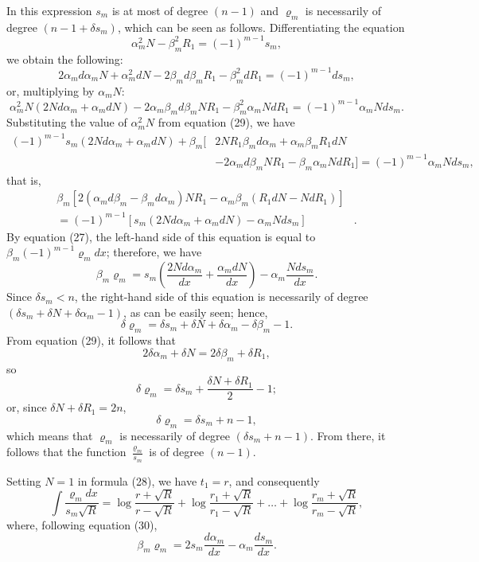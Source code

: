 \documentclass[oneside, 12 pt, leqno]{memoir}
\begin{document}
In this expression \(s_m\) is at most of degree \((n-1)\) and \(\varrho_m\) is necessarily of degree \((n-1+\delta s_m)\), which can be seen as follows. 
Differentiating the equation 
\[\tag{29}\alpha_m^2 N-\beta_m^2 R_1=(-1)^{m-1} s_m,\]
we obtain the following:
\[2 \alpha_m d \alpha_m N+\alpha_m^2 d N-2 \beta_m d \beta_m R_1-\beta_m^2 d R_1=(-1)^{m-1} d s_m,\]
or, multiplying by \(\alpha_m N\):
\[\alpha_m^2 N\left(2 N d \alpha_m+\alpha_m d N\right)-2 \alpha_m \beta_m d \beta_m N R_1-\beta_m^2 \alpha_m N d R_1=(-1)^{m-1} \alpha_m N d s_m.\]
Substituting the value of \(\alpha_m^2 N\) from equation (29), we have
\[\begin{aligned}
(-1)^{m-1} s_m\left(2 N d \alpha_m+\alpha_m d N\right) +\beta_m [&2 N R_1 \beta_m d \alpha_m+\alpha_m \beta_m R_1 d N \\
&-2 \alpha_m d \beta_m N R_1 -\beta_m \alpha_m N d R_1]
=(-1)^{m-1} \alpha_m N d s_m,
\end{aligned}\]
that is,
\[\begin{aligned}
\beta_m\left[2\left(\alpha_m d \beta_m-\beta_m d \alpha_m\right) N R_1-\alpha_m \beta_m\left(R_1 d N-N d R_1\right)\right] &\\
=(-1)^{m-1}\left[s_m\left(2 N d \alpha_m+\alpha_m d N\right)-\alpha_m N d s_m\right]&.
\end{aligned}\]
By equation (27), the left-hand side of this equation is equal to \(\beta_m(-1)^{m-1} \varrho_m d x\); therefore, we have
\[\tag{30} \beta_m \varrho_m=s_m\left(\frac{2 N d \alpha_m}{d x}+\frac{\alpha_m d N}{d x}\right)-\alpha_m \frac{N d s_m}{d x}.\]
Since \(\delta s_m<n\), the right-hand side of this equation is necessarily of degree \(\left(\delta s_m+\delta N+\delta \alpha_m-1\right)\), as can be easily seen; hence,
\[\delta \varrho_m=\delta s_m+\delta N+\delta \alpha_m-\delta \beta_m-1.\]
From equation (29), it follows that
\[2 \delta \alpha_m+\delta N=2 \delta \beta_m+\delta R_1,\]
so
\[\delta \varrho_m=\delta s_m+\frac{\delta N+\delta R_1}{2}-1;\]
or, since \(\delta N+\delta R_1=2 n\),
\[\delta \varrho_m=\delta s_m+n-1,\]
which means that \(\varrho_m\) is necessarily of degree \(\left(\delta s_m+n-1\right)\). From there, it follows that the function \(\frac{\varrho_m}{s_m}\) is of degree \((n-1)\).

Setting \(N=1\) in formula (28), we have \(t_1=r\), and consequently
\[\tag{31}\int \frac{\varrho_m d x}{s_m \sqrt{R}}=\log \frac{r+\sqrt{R}}{r-\sqrt{R}}+\log \frac{r_1+\sqrt{R}}{r_1-\sqrt{R}}+\dots+\log \frac{r_m+\sqrt{R}}{r_m-\sqrt{R}},\]
where, following equation (30),
\[\beta_m \varrho_m=2 s_m \frac{d \alpha_m}{d x}-\alpha_m \frac{d s_m}{d x}.\]
\end{document}
